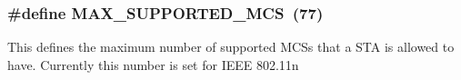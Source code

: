 \subsubsection[{\texorpdfstring{M\+A\+X\+\_\+\+S\+U\+P\+P\+O\+R\+T\+E\+D\+\_\+\+M\+CS}{MAX_SUPPORTED_MCS}}]{\setlength{\rightskip}{0pt plus 5cm}\#define M\+A\+X\+\_\+\+S\+U\+P\+P\+O\+R\+T\+E\+D\+\_\+\+M\+CS~(77)}\hypertarget{ht-operation_8h_a309e0519adb78c8fe6aed48ca762e21e}{}\label{ht-operation_8h_a309e0519adb78c8fe6aed48ca762e21e}
This defines the maximum number of supported M\+C\+Ss that a S\+TA is allowed to have. Currently this number is set for I\+E\+EE 802.\+11n 
